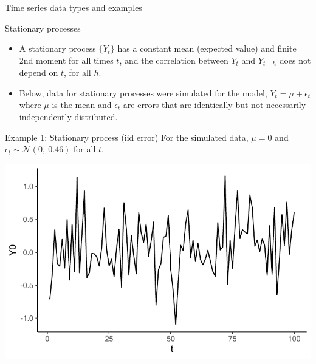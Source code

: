 \documentclass[
  9pt,
  ignorenonframetext,
]{beamer}
\begin{document}
\begin{frame}{Time series data types and examples}
\protect\hypertarget{time-series-data-types-and-examples-1}{}
\begin{block}{Stationary processes}
\protect\hypertarget{stationary-processes}{}
\begin{itemize}
\item
  A stationary process \(\{Y_t\}\) has a constant mean (expected value)
  and finite 2nd moment for all times \(t\), and the correlation between
  \(Y_t\) and \(Y_{t+h}\) does not depend on \(t\), for all \(h\).
\item
  Below, data for stationary processes were simulated for the model,
  \(Y_t = \mu + \epsilon_t\) where \(\mu\) is the mean and
  \(\epsilon_t\) are errors that are identically but not necessarily
  independently distributed.
\end{itemize}
\end{block}

\begin{block}{Example 1: Stationary process (iid error)}
\protect\hypertarget{example-1-stationary-process-iid-error}{}
For the simulated data, \(\mu=0\) and
\(\epsilon_t \sim \mathcal {N} (0,\ 0.46)\) for all \(t\).

\begin{center}\includegraphics[width=0.5\linewidth]{figs_L1/stationary-1} \end{center}
\end{block}
\end{frame}
\end{document}
